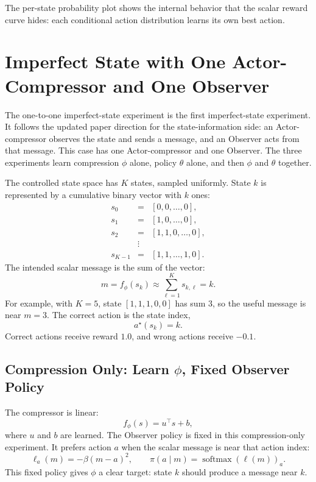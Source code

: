 \documentclass[11pt]{article}
\begin{document}
The per-state probability plot shows the internal behavior that the scalar reward
curve hides: each conditional action distribution learns its own best action.

\section{Imperfect State with One Actor-Compressor and One Observer}

The one-to-one imperfect-state experiment is the first imperfect-state experiment.
It follows the updated paper
direction for the state-information side: an Actor-compressor observes the
state and sends a message, and an Observer acts from that message. This case
has one Actor-compressor and one Observer. The three experiments learn
compression \(\phi\) alone, policy \(\theta\) alone, and then
\(\phi\) and \(\theta\) together.

The controlled state space has \(K\) states, sampled uniformly. State \(k\) is
represented by a cumulative binary vector with \(k\) ones:
\[
\begin{array}{rcl}
  s_0 &=& [0,0,\ldots,0],\\
  s_1 &=& [1,0,\ldots,0],\\
  s_2 &=& [1,1,0,\ldots,0],\\
      &\vdots& \\
  s_{K-1} &=& [1,1,\ldots,1,0].
\end{array}
\]
The intended scalar message is the sum of the vector:
\[
  m=f_\phi(s_k)\approx \sum_{\ell=1}^K s_{k,\ell}=k.
\]
For example, with \(K=5\), state
\([1,1,1,0,0]\) has sum \(3\), so the useful message is near \(m=3\).
The correct action is the state index,
\[
  a^\star(s_k)=k.
\]
Correct actions receive reward \(1.0\), and wrong actions receive \(-0.1\).

\subsection{Compression Only: Learn \(\phi\), Fixed Observer Policy}

The compressor is linear:
\[
  f_\phi(s)=u^\top s+b,
\]
where \(u\) and \(b\) are learned. The Observer policy is fixed in this
compression-only experiment. It prefers action \(a\) when the scalar message is near
that action index:
\[
  \ell_a(m)=-\beta(m-a)^2,\qquad
  \pi(a\mid m)=\operatorname{softmax}(\ell(m))_a .
\]
This fixed policy gives \(\phi\) a clear target: state \(k\) should produce a
message near \(k\).
\end{document}
